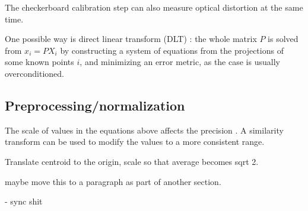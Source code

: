The checkerboard calibration step can also measure optical distortion at the same time. \cite{opencv,camcalmatlab}



One possible way is direct linear transform (DLT)
\cite{hartley03multiview}: the whole matrix $P$ is solved from $x_i = PX_i$ by constructing a system of equations from the projections of some known points $i$, and minimizing an error metric, as the case is usually overconditioned.









\subsection{Preprocessing/normalization} %

The scale of values in the equations above affects the precision \cite{hartley1997defense,hartley03multiview}.
A similarity transform can be used to modify the values to a more consistent range.

Translate centroid to the origin, scale so that average becomes sqrt 2.

maybe move this to a paragraph as part of another section.

- sync shit

